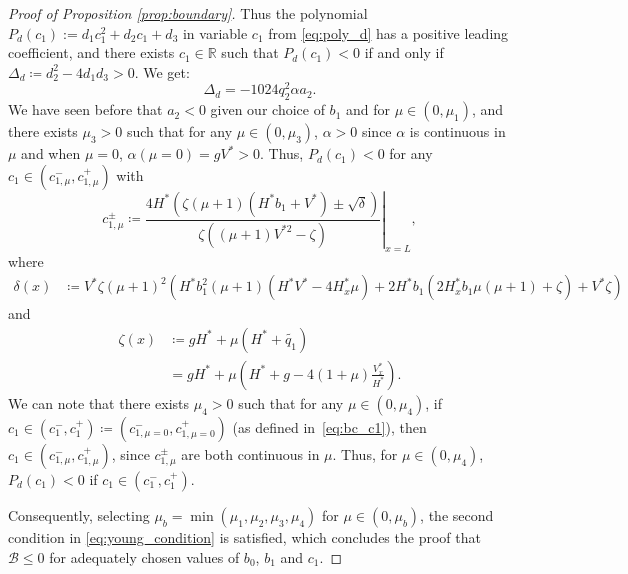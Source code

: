 \documentclass[11pt]{article}
\begin{document}
\begin{proof}[Proof of Proposition \ref{prop:boundary}]
Thus the polynomial $P_d(c_1) := d_1c_1^2 + d_2c_1 + d_3$ in variable $c_1$ from \eqref{eq:poly_d} has a positive leading coefficient,
and there exists $c_1 \in \mathbb R$ such that $P_d(c_1) < 0$ if and only if $\Delta_d \coloneqq d_2^2 - 4d_1d_3 > 0$.
We get:
\begin{equation}
    \Delta_d = -1024 q_2^2 \alpha a_2.
\end{equation}
We have seen before that $a_2 < 0$ given our choice of $b_1$ and for $\mu \in (0, {\mu_1})$, and there exists ${\mu_3}>0$ such that for any $\mu \in (0,{\mu_3})$, $\alpha > 0$ since $\alpha$ is continuous in $\mu$ and when $\mu=0$, $\alpha(\mu=0) = g{V^{*}} > 0$. Thus, $P_d(c_1) < 0$ for any $c_1 \in (c_{1,\mu}^-, c_{1,\mu}^+)$ with
\begin{equation}
    c_{1,\mu}^\pm \coloneqq \left. \frac{4 H^*\left(\zeta \left(\mu + 1\right) \left(H^* b_{1} + V^*\right) \pm \sqrt{\delta}\right)}{\zeta \left( (\mu+1) V^{*2} - \zeta\right)} \right|_{x=L},
\end{equation}
where
\begin{equation}
\begin{split}
    \delta(x) & \coloneqq  V^* \zeta \left(\mu + 1\right)^{2} (H^* b_{1}^{2} \left(\mu + 1\right) \left(H^* V^* - 4 H_{x}^* \mu\right)  + 2 H^* b_{1}  \left(2 H_{x}^* b_{1} \mu \left(\mu + 1\right) + \zeta\right) + V^* \zeta )
\end{split}
\end{equation}
and
\begin{equation}
\begin{split}
    \zeta(x) &\coloneqq gH^* + \mu \left(H^* + \tilde{q_1} \right) \\ &= gH^* + \mu \left(H^* + g - 4(1+\mu) \frac{V_x^*}{H^*} \right).
\end{split}
\end{equation}
We can note that there exists ${\mu_4} > 0$ such that for any $\mu \in (0, {\mu_4})$, if $c_1 \in (c_1^-, c_1^+) \coloneqq (c_{1,\mu=0}^-, c_{1,\mu=0}^+)$ {(as defined in~\eqref{eq:bc_c1}),}
then $c_1 \in (c_{1,\mu}^-, c_{1,\mu}^+)$, since 
 $c_{1,\mu}^\pm$ are both continuous in $\mu$. Thus, for $\mu \in (0, {\mu_4})$, $P_d(c_1)<0$ if $c_1 \in (c_1^-, c_1^+)$.

Consequently, {selecting $\mu_{b} = \min({\mu_1,\mu_2,\mu_3,\mu_4})$ for $\mu \in (0, \mu_{b})$}, the second condition in \eqref{eq:young_condition} is satisfied, which concludes the proof that $\mathcal{B} \leq 0$ for adequately chosen values of $b_0$, $b_1$ and $c_1$.
\end{proof}
\end{document}

